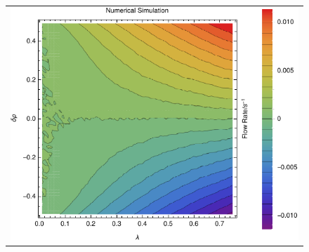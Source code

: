\documentclass[
reprint,
 amsmath,amssymb,
 aps,
 prl
]{revtex4-1}
\begin{document}
\begin{figure}[h!]
\begin{center}
\begin{tabular}{c}
    \includegraphics[width=0.98\linewidth]{newFlow}
    \end{tabular}
\end{center}
    \vspace{-2.5em}
\end{figure}
\end{document}
